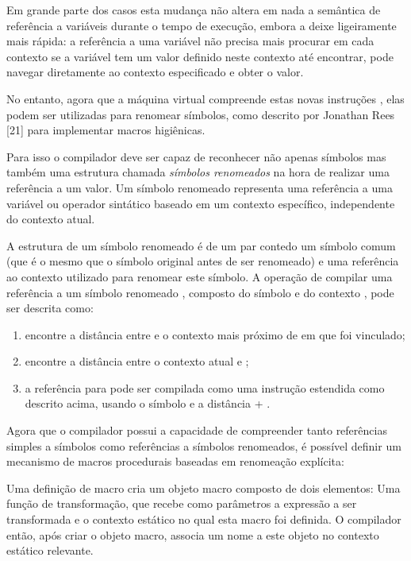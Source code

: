 Em grande parte dos casos esta mudança não altera em nada a semântica de
referência a variáveis durante o tempo de execução, embora a deixe ligeiramente
mais rápida: a referência a uma variável não precisa mais procurar em cada
contexto se a variável tem um valor definido neste contexto até encontrar, pode
navegar diretamente ao contexto especificado e obter o valor.

No entanto, agora que a máquina virtual compreende estas novas instruções
, elas podem ser utilizadas para renomear símbolos, como descrito
por Jonathan Rees [21] para implementar macros higiênicas.

Para isso o compilador deve ser capaz de reconhecer
não apenas símbolos mas também uma estrutura chamada \textit{símbolos
renomeados} na hora de realizar uma referência a um valor. Um símbolo renomeado
representa uma referência a uma variável ou operador sintático baseado em um
contexto específico, independente do contexto atual.

A estrutura de um símbolo renomeado é de um par contedo um símbolo comum (que é
o mesmo que o símbolo original antes de ser renomeado) e uma referência ao
contexto utilizado para renomear este símbolo. A operação de compilar uma
referência a um símbolo renomeado , composto do símbolo  e do
contexto , pode ser descrita como: 

\begin{enumerate}

\item encontre a distância  entre  e o contexto mais próximo
de  em que  foi vinculado;
 
\item encontre a distância  entre o contexto atual e ;

\item a referência para  pode ser compilada como uma instrução 
 estendida como descrito acima, usando o símbolo  e a 
distância  + . 

\end{enumerate}

Agora que o compilador possui a capacidade de compreender tanto referências
simples a símbolos como referências a símbolos renomeados, é possível definir
um mecanismo de macros procedurais baseadas em renomeação explícita:

Uma definição de macro cria um objeto macro composto de dois elementos: Uma
função de transformação, que recebe como parâmetros a expressão a ser
transformada e o contexto estático no qual esta macro foi definida. O
compilador então, após criar o objeto macro, associa um nome a este objeto no
contexto estático relevante.


